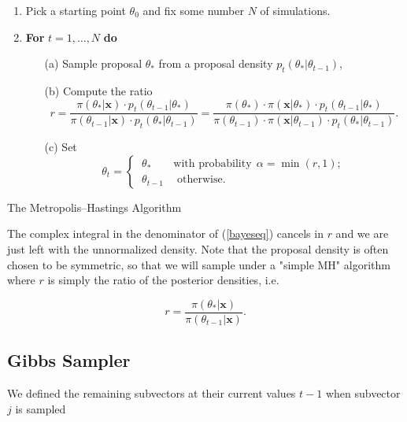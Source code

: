 \begin{algorithm}[H]
	\SetAlgoLined
	\begin{enumerate}
		\item Pick a starting point $\theta_0$ and fix some number $N$ of simulations.
		\item \textbf{For} $t=1,\dots,N$ \quad \textbf{do}
		\begin{itemize}
			\item[(a)] Sample proposal $\theta_*$ from a proposal density $p_t(\theta_*|\theta_{t-1})$,
			\item[(b)] Compute the ratio
			\begin{equation*}
			r = \frac{\pi(\theta_*|\boldsymbol{x})\cdot p_t(\theta_{t-1}|\theta_*)}{\pi(\theta_{t-1}|\boldsymbol{x})\cdot p_t(\theta_*|\theta_{t-1})} = \frac{\pi(\theta_*)\cdot \pi(\boldsymbol{x}|\theta_*)\cdot p_t(\theta_{t-1}|\theta_*)}{\pi(\theta_{t-1})\cdot \pi(\boldsymbol{x}|\theta_{t-1})\cdot p_t(\theta_*|\theta_{t-1})}.
			\end{equation*}
			\item[(c)] Set 
			\begin{equation*}
			\theta_t= 			\begin{cases} \ \theta_* \qquad \text{with probability} \ \  \alpha=\min (r,1); \\
			\ \theta_{t-1} \ \quad \text{otherwise}.
			\end{cases}
			\end{equation*}
		\end{itemize}
	\end{enumerate}
	\caption{The Metropolis–Hastings Algorithm}\label{algo:mh}
\end{algorithm}
The complex integral in the denominator of (\ref{bayeseq}) cancels in $r$ and we are just left with the unnormalized density.
Note that the proposal density is often chosen to be symmetric, so that we will sample under a "simple MH" algorithm where $r$ is simply the ratio of the posterior densities, i.e. 

\begin{equation} r=\frac{\pi(\theta_*|\boldsymbol{x}) }{\pi(\theta_{t-1}|\boldsymbol{x})}.
\end{equation}


\subsection{Gibbs Sampler}\label{app:gibbs}

We defined the remaining subvectors at their current values $t-1$ when subvector $j$ is sampled 

